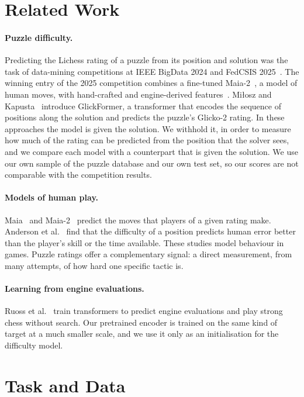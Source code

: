 \documentclass[11pt]{article}
\begin{document}
\section{Related Work}
\label{sec:related}

\paragraph{Puzzle difficulty.}
Predicting the Lichess rating of a puzzle from its position and solution was
the task of data-mining competitions at IEEE BigData 2024 and FedCSIS
2025~\cite{puzzlecup}. The winning entry of the 2025 competition combines a
fine-tuned Maia-2~\cite{maia2}, a model of human moves, with hand-crafted and
engine-derived features~\cite{puzzlecupwinner}. Mi{\l}osz and
Kapusta~\cite{glickformer} introduce GlickFormer, a transformer that encodes
the sequence of positions along the solution and predicts the puzzle's
Glicko-2 rating. In these approaches the model is given the solution. We
withhold it, in order to measure how much of the rating can be predicted from
the position that the solver sees, and we compare each model with a
counterpart that is given the solution. We use our own sample of the puzzle
database and our own test set, so our scores are not comparable with the
competition results.

\paragraph{Models of human play.}
Maia~\cite{maia} and Maia-2~\cite{maia2} predict the moves that players of a
given rating make. Anderson et al.~\cite{humanerror} find that the difficulty
of a position predicts human error better than the player's skill or the time
available. These studies model behaviour in games. Puzzle ratings offer a
complementary signal: a direct measurement, from many attempts, of how hard
one specific tactic is.

\paragraph{Learning from engine evaluations.}
Ruoss et al.~\cite{searchless} train transformers to predict engine
evaluations and play strong chess without search. Our pretrained encoder is
trained on the same kind of target at a much smaller scale, and we use it
only as an initialisation for the difficulty model.

\section{Task and Data}
\label{sec:data}
\end{document}
